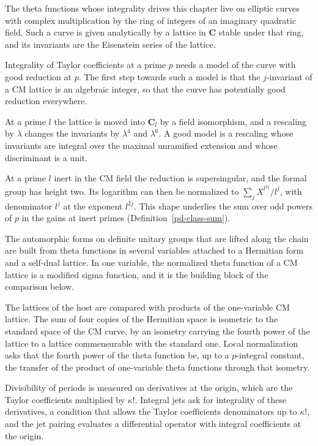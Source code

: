 The theta functions whose integrality drives this chapter live on elliptic curves with complex
multiplication by the ring of integers of an imaginary quadratic field. Such a curve is given
analytically by a lattice in $\mathbf C$ stable under that ring, and its invariants are the
Eisenstein series of the lattice.

Integrality of Taylor coefficients at a prime $p$ needs a model of the curve with good reduction
at $p$. The first step towards such a model is that the $j$-invariant of a CM lattice is an
algebraic integer, so that the curve has potentially good reduction everywhere.

At a prime $l$ the lattice is moved into $\mathbf C_l$ by a field isomorphism, and a rescaling by
$\lambda$ changes the invariants by $\lambda^4$ and $\lambda^6$. A good model is a rescaling whose
invariants are integral over the maximal unramified extension and whose discriminant is a unit.

At a prime $l$ inert in the CM field the reduction is supersingular, and the formal group has
height two. Its logarithm can then be normalized to $\sum_jX^{l^{2j}}/l^j$, with denominator $l^j$
at the exponent $l^{2j}$. This shape underlies the sum over odd powers of $p$ in the gains at
inert primes (Definition~\ref{pd-class-sum}).

The automorphic forms on definite unitary groups that are lifted along the chain are built from
theta functions in several variables attached to a Hermitian form and a self-dual lattice. In
one variable, the normalized theta function of a CM lattice is a modified sigma function, and it
is the building block of the comparison below.

The lattices of the host are compared with products of the one-variable CM lattice. The sum of
four copies of the Hermitian space is isometric to the standard space of the CM curve, by an
isometry carrying the fourth power of the lattice to a lattice commensurable with the standard
one. Local normalization asks that the fourth power of the theta function be, up to a $p$-integral
constant, the transfer of the product of one-variable theta functions through that isometry.

Divisibility of periods is measured on derivatives at the origin, which are the Taylor
coefficients multiplied by $\kappa!$. Integral jets ask for integrality of these derivatives, a
condition that allows the Taylor coefficients denominators up to $\kappa!$, and the jet pairing
evaluates a differential operator with integral coefficients at the origin.

